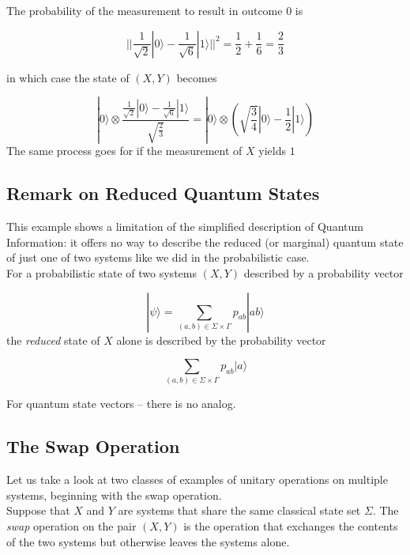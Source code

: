 \documentclass[svgnames]{article}     %
\begin{document}
The probability of the measurement to result in outcome 0 is 

\[
  \Big| \Big| \frac{1}{\sqrt{2}}|0\rangle - \frac{1}{\sqrt{6}}|1\rangle \Big|\Big|^2 = \frac{1}{2} + \frac{1}{6} = \frac{2}{3}
\] \vspace{5px}

in which case the state of  $(X, Y)$ becomes

\[
  |0\rangle \otimes \frac{\frac{1}{\sqrt{2}} |0\rangle - \frac{1}{\sqrt{6}}|1\rangle}{\sqrt{\frac{2}{3}}} = |0\rangle \otimes \left( \sqrt{\frac{3}{4}} |0\rangle - \frac{1}{2}|1\rangle \right)
\] \vspace{5px}
The same process goes for if the measurement of $X$ yields $1$

\subsection{Remark on Reduced Quantum States}

This example shows a limitation of the simplified description of Quantum Information: it offers no way to describe the reduced (or marginal) quantum state of just one of two systems like we did in the probabilistic case. \\

For a probabilistic state of two systems $(X, Y)$ described by a probability vector

\[
  |\psi\rangle = \sum_{(a,b)\in\Sigma\times\Gamma} p_{ab}|ab\rangle 
\] \vspace{5px}
the \textit{reduced} state of $X$ alone is described by the probability vector 

\[
  \sum_{(a,b)\in\Sigma\times\Gamma} p_{ab}|a\rangle 
\] \vspace{5px}

For quantum state vectors -- there is no analog. 

\subsection{The Swap Operation} 

Let us take a look at two classes of examples of unitary operations on multiple systems, beginning with the swap operation. \\

Suppose that $X$ and $Y$ are systems that share the same classical state set $\Sigma$. The \textit{swap} operation on the pair $(X, Y)$ is the operation that exchanges the contents of the two systems but otherwise leaves the systems alone. \\ 
\end{document}
